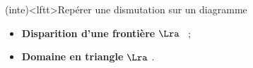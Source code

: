 \documentclass[a4paper, 10pt, landscape, twocolumn]{book}
\begin{document}
\begin{tcb*}(inte)<lftt>{Repérer une dismutation sur un diagramme}
	\begin{itemize}
		\item \textbf{Disparition d'une frontière} $\Lra$ ~;
		\item \textbf{Domaine en triangle} $\Lra$ .
	\end{itemize}
\end{tcb*}
\vspace{-15pt}
\end{document}
